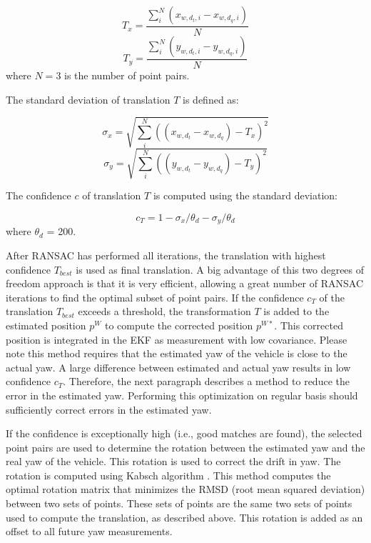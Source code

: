 \begin{equation}
T_x = \frac{\sum_{i}^{N} (x_{w, d_t, i} - x_{w, d_q, i})}{N}
\end{equation}
\begin{equation}
T_y = \frac{\sum_{i}^{N} (y_{w, d_t ,i} - y_{w, d_q, i})}{N}
\end{equation}
where $N = 3$ is the number of point pairs.

The standard deviation of translation  $T$ is defined as:

\begin{equation}
\sigma_x = \sqrt{  \sum_{i}^{N}   ((x_{w, d_t} - x_{w, d_q}) - T_x)^{2}   }
\end{equation}
\begin{equation}
\sigma_y = \sqrt{  \sum_{i}^{N}   ((y_{w, d_t} - y_{w, d_q}) - T_y)^{2}   }
\end{equation}

The confidence $c$ of translation $T$ is computed using the standard deviation:

\begin{equation}
c_{T} = 1 -   \sigma_x / \theta_{d} -  \sigma_y / \theta_{d}
\end{equation}
where $\theta_d$ = 200.

After RANSAC has performed all iterations, the translation with highest confidence $T_{best}$ is used as final translation.
A big advantage of this two degrees of freedom approach is that it is very efficient, allowing a great number of RANSAC iterations to find the optimal subset of point pairs.
If the confidence $c_{T}$ of the translation $T_{best}$ exceeds a threshold, the transformation $T$ is added to the estimated position $p^W$ to compute the corrected position $p^{W*}$. This corrected position is integrated in the EKF as measurement with low covariance.
Please note this method requires that the estimated yaw of the vehicle is close to the actual yaw.
A large difference between estimated and actual yaw results in low confidence $c_T$.
Therefore, the next paragraph describes a method to reduce the error in the estimated yaw.
Performing this optimization on regular basis should sufficiently correct errors in the estimated yaw.


If the confidence is exceptionally high (i.e., good matches are found), the selected point pairs are used to determine the rotation between the estimated yaw and the real yaw of the vehicle. This rotation is used to correct the drift in yaw.
The rotation is computed using Kabsch algorithm \cite{Kabsch:a12999}.
This method computes the optimal rotation matrix that minimizes the RMSD (root mean squared deviation) between two sets of points.
These sets of points are the same two sets of points used to compute the translation, as described above.
This rotation is added as an offset to all future yaw measurements.


